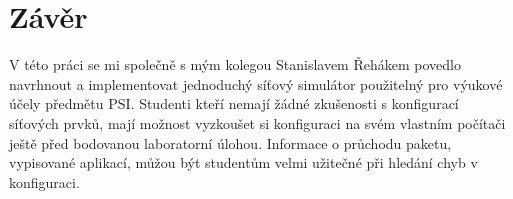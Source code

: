 % 


\chapter{Závěr}

V této práci se mi společně s mým kolegou Stanislavem Řehákem povedlo navrhnout a implementovat jednoduchý síťový simulátor použitelný pro výukové účely předmětu PSI. Studenti kteří nemají žádné zkušenosti s konfigurací síťových prvků, mají možnost vyzkoušet si konfiguraci na svém vlastním počítači ještě před bodovanou laboratorní úlohou. Informace o průchodu paketu, vypisované aplikací, můžou být studentům velmi užitečné při hledání chyb v konfiguraci.  